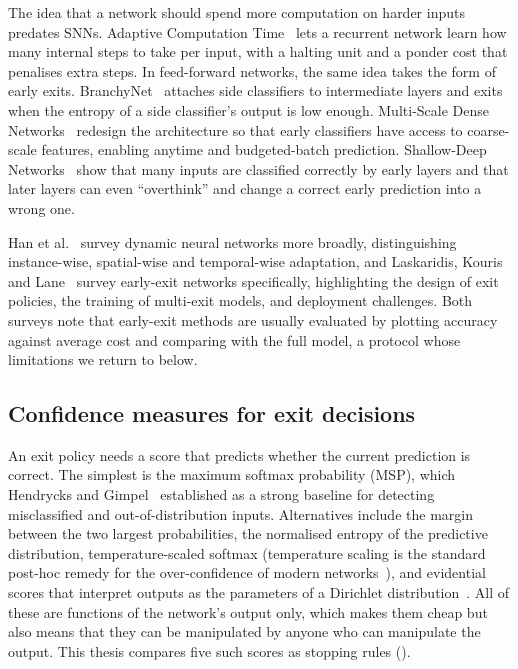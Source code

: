The idea that a network should spend more computation on harder inputs predates SNNs. Adaptive Computation Time~\cite{graves2016adaptive} lets a recurrent network learn how many internal steps to take per input, with a halting unit and a ponder cost that penalises extra steps. In feed-forward networks, the same idea takes the form of early exits. BranchyNet~\cite{teerapittayanon2016branchynet} attaches side classifiers to intermediate layers and exits when the entropy of a side classifier's output is low enough. Multi-Scale Dense Networks~\cite{huang2018multi} redesign the architecture so that early classifiers have access to coarse-scale features, enabling anytime and budgeted-batch prediction. Shallow-Deep Networks~\cite{kaya2019shallow} show that many inputs are classified correctly by early layers and that later layers can even ``overthink'' and change a correct early prediction into a wrong one.

Han et al.~\cite{han2022dynamic} survey dynamic neural networks more broadly, distinguishing instance-wise, spatial-wise and temporal-wise adaptation, and Laskaridis, Kouris and Lane~\cite{laskaridis2021adaptive} survey early-exit networks specifically, highlighting the design of exit policies, the training of multi-exit models, and deployment challenges. Both surveys note that early-exit methods are usually evaluated by plotting accuracy against average cost and comparing with the full model, a protocol whose limitations we return to below.

\subsection{Confidence measures for exit decisions}

An exit policy needs a score that predicts whether the current prediction is correct. The simplest is the maximum softmax probability (MSP), which Hendrycks and Gimpel~\cite{hendrycks2017baseline} established as a strong baseline for detecting misclassified and out-of-distribution inputs. Alternatives include the margin between the two largest probabilities, the normalised entropy of the predictive distribution, temperature-scaled softmax (temperature scaling is the standard post-hoc remedy for the over-confidence of modern networks~\cite{guo2017calibration}), and evidential scores that interpret outputs as the parameters of a Dirichlet distribution~\cite{sensoy2018evidential}. All of these are functions of the network's output only, which makes them cheap but also means that they can be manipulated by anyone who can manipulate the output. This thesis compares five such scores as stopping rules ().

